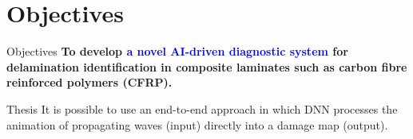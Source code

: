 \documentclass[10pt,aspectratio=169,dvipsnames]{beamer} %
\begin{document}
\section{Objectives}
\begin{frame}{Objectives}
		\textbf{To develop \textcolor{blue}{a novel AI-driven diagnostic system} for delamination identification in composite laminates such as carbon fibre reinforced polymers (CFRP).}
		\\
	\begin{alertblock}{Thesis}
		It is possible to use an end-to-end approach in which DNN 
		processes the animation of propagating waves (input) directly into a damage map (output).
	\end{alertblock}
\end{frame}
\end{document}
